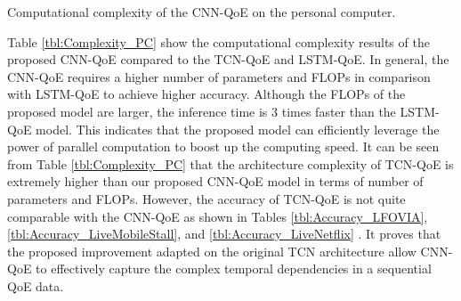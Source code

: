 \begin{table}[tb]
  \caption{Computational complexity of the CNN-QoE on the personal computer.}
  \label{tbl:Complexity_PC}
  \centering
  
\end{table}


Table \ref{tbl:Complexity_PC} show the computational complexity results of the proposed CNN-QoE compared to the TCN-QoE and LSTM-QoE.
In general, the CNN-QoE requires a higher number of parameters and FLOPs in comparison with LSTM-QoE to achieve higher accuracy.
Although the FLOPs of the proposed model are larger, the inference time is 3 times faster than the LSTM-QoE model.
This indicates that the proposed model can efficiently leverage the power of parallel computation to boost up the computing speed.
It can be seen from Table \ref{tbl:Complexity_PC} that the architecture complexity of TCN-QoE is extremely higher than our proposed CNN-QoE model in terms of number of parameters and FLOPs.
However, the accuracy of TCN-QoE is not quite comparable with the CNN-QoE as shown in Tables \ref{tbl:Accuracy_LFOVIA}, \ref{tbl:Accuracy_LiveMobileStall}, and \ref{tbl:Accuracy_LiveNetflix} .
It proves that the proposed improvement adapted on the original TCN architecture allow CNN-QoE to effectively capture the complex temporal dependencies in a sequential QoE data.


